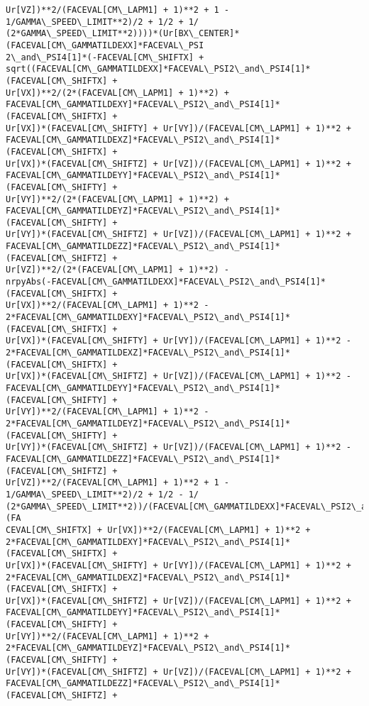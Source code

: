 \documentclass[landscape,letterpaper,10pt,english]{article}
\begin{document}
\begin{Verbatim}[commandchars=\\\{\}]
Ur[VZ])**2/(FACEVAL[CM\_LAPM1] + 1)**2 + 1 - 1/GAMMA\_SPEED\_LIMIT**2)/2 + 1/2 + 1/
(2*GAMMA\_SPEED\_LIMIT**2))))*(Ur[BX\_CENTER]*(FACEVAL[CM\_GAMMATILDEXX]*FACEVAL\_PSI
2\_and\_PSI4[1]*(-FACEVAL[CM\_SHIFTX] +
sqrt((FACEVAL[CM\_GAMMATILDEXX]*FACEVAL\_PSI2\_and\_PSI4[1]*(FACEVAL[CM\_SHIFTX] +
Ur[VX])**2/(2*(FACEVAL[CM\_LAPM1] + 1)**2) +
FACEVAL[CM\_GAMMATILDEXY]*FACEVAL\_PSI2\_and\_PSI4[1]*(FACEVAL[CM\_SHIFTX] +
Ur[VX])*(FACEVAL[CM\_SHIFTY] + Ur[VY])/(FACEVAL[CM\_LAPM1] + 1)**2 +
FACEVAL[CM\_GAMMATILDEXZ]*FACEVAL\_PSI2\_and\_PSI4[1]*(FACEVAL[CM\_SHIFTX] +
Ur[VX])*(FACEVAL[CM\_SHIFTZ] + Ur[VZ])/(FACEVAL[CM\_LAPM1] + 1)**2 +
FACEVAL[CM\_GAMMATILDEYY]*FACEVAL\_PSI2\_and\_PSI4[1]*(FACEVAL[CM\_SHIFTY] +
Ur[VY])**2/(2*(FACEVAL[CM\_LAPM1] + 1)**2) +
FACEVAL[CM\_GAMMATILDEYZ]*FACEVAL\_PSI2\_and\_PSI4[1]*(FACEVAL[CM\_SHIFTY] +
Ur[VY])*(FACEVAL[CM\_SHIFTZ] + Ur[VZ])/(FACEVAL[CM\_LAPM1] + 1)**2 +
FACEVAL[CM\_GAMMATILDEZZ]*FACEVAL\_PSI2\_and\_PSI4[1]*(FACEVAL[CM\_SHIFTZ] +
Ur[VZ])**2/(2*(FACEVAL[CM\_LAPM1] + 1)**2) -
nrpyAbs(-FACEVAL[CM\_GAMMATILDEXX]*FACEVAL\_PSI2\_and\_PSI4[1]*(FACEVAL[CM\_SHIFTX] +
Ur[VX])**2/(FACEVAL[CM\_LAPM1] + 1)**2 -
2*FACEVAL[CM\_GAMMATILDEXY]*FACEVAL\_PSI2\_and\_PSI4[1]*(FACEVAL[CM\_SHIFTX] +
Ur[VX])*(FACEVAL[CM\_SHIFTY] + Ur[VY])/(FACEVAL[CM\_LAPM1] + 1)**2 -
2*FACEVAL[CM\_GAMMATILDEXZ]*FACEVAL\_PSI2\_and\_PSI4[1]*(FACEVAL[CM\_SHIFTX] +
Ur[VX])*(FACEVAL[CM\_SHIFTZ] + Ur[VZ])/(FACEVAL[CM\_LAPM1] + 1)**2 -
FACEVAL[CM\_GAMMATILDEYY]*FACEVAL\_PSI2\_and\_PSI4[1]*(FACEVAL[CM\_SHIFTY] +
Ur[VY])**2/(FACEVAL[CM\_LAPM1] + 1)**2 -
2*FACEVAL[CM\_GAMMATILDEYZ]*FACEVAL\_PSI2\_and\_PSI4[1]*(FACEVAL[CM\_SHIFTY] +
Ur[VY])*(FACEVAL[CM\_SHIFTZ] + Ur[VZ])/(FACEVAL[CM\_LAPM1] + 1)**2 -
FACEVAL[CM\_GAMMATILDEZZ]*FACEVAL\_PSI2\_and\_PSI4[1]*(FACEVAL[CM\_SHIFTZ] +
Ur[VZ])**2/(FACEVAL[CM\_LAPM1] + 1)**2 + 1 - 1/GAMMA\_SPEED\_LIMIT**2)/2 + 1/2 - 1/
(2*GAMMA\_SPEED\_LIMIT**2))/(FACEVAL[CM\_GAMMATILDEXX]*FACEVAL\_PSI2\_and\_PSI4[1]*(FA
CEVAL[CM\_SHIFTX] + Ur[VX])**2/(FACEVAL[CM\_LAPM1] + 1)**2 +
2*FACEVAL[CM\_GAMMATILDEXY]*FACEVAL\_PSI2\_and\_PSI4[1]*(FACEVAL[CM\_SHIFTX] +
Ur[VX])*(FACEVAL[CM\_SHIFTY] + Ur[VY])/(FACEVAL[CM\_LAPM1] + 1)**2 +
2*FACEVAL[CM\_GAMMATILDEXZ]*FACEVAL\_PSI2\_and\_PSI4[1]*(FACEVAL[CM\_SHIFTX] +
Ur[VX])*(FACEVAL[CM\_SHIFTZ] + Ur[VZ])/(FACEVAL[CM\_LAPM1] + 1)**2 +
FACEVAL[CM\_GAMMATILDEYY]*FACEVAL\_PSI2\_and\_PSI4[1]*(FACEVAL[CM\_SHIFTY] +
Ur[VY])**2/(FACEVAL[CM\_LAPM1] + 1)**2 +
2*FACEVAL[CM\_GAMMATILDEYZ]*FACEVAL\_PSI2\_and\_PSI4[1]*(FACEVAL[CM\_SHIFTY] +
Ur[VY])*(FACEVAL[CM\_SHIFTZ] + Ur[VZ])/(FACEVAL[CM\_LAPM1] + 1)**2 +
FACEVAL[CM\_GAMMATILDEZZ]*FACEVAL\_PSI2\_and\_PSI4[1]*(FACEVAL[CM\_SHIFTZ] +

\end{Verbatim}
\end{document}
